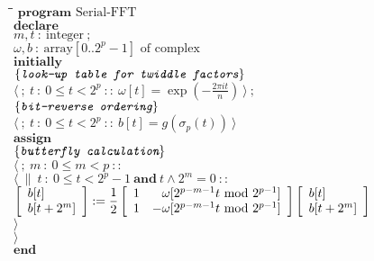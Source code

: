\begin{tabbing}
	\quad\=\quad\=\quad\=\kill
	$\mathbf{program} \textrm{ Serial-FFT}$\\
	$\mathbf{declare}$\\
		\>$m,t\ :\ \textrm{integer}\ ;$\\
		\>$\omega,b\ :\ \mathrm{array}[0..2^{p}-1] \textrm{ of complex}$\\
	$\mathbf{initially}$\\
		\>$\color{MidnightBlue}\curlb{\textit{\ttfamily look-up table for twiddle factors}}$\\
		\>$\langle \ ;\ t\ :\ 0\leq t<2^p\ ::\ \omega[t] = \exp(-\frac{2\pi it}{n})\ \rangle\ ;$\\
		\>$\color{MidnightBlue}\curlb{\textit{\ttfamily bit-reverse ordering}}$\\
		\>$\langle \ ;\ t\ :\ 0\leq t<2^p\ ::\ b[t] = g(\sigma_p(t))\ \rangle$\\
	$\mathbf{assign}$\\
		\>$\color{MidnightBlue}\curlb{\textit{\ttfamily butterfly calculation}}$\\
		\>$\langle \ ;\ m\ :\ 0\leq m<p\ ::$\\
			\>\>$\langle \ \|\ t\ :\ 0\leq t<2^{p}-1\ \mathbf{and}\ t\wedge 2^m=0\ ::$\\
				\>\>\>$\boxb{ \begin{array}{l} b[t] \\ b[t+2^m] \end{array} } := \dfrac{1}{2} \boxb{ \begin{array}{lr} 1 & \omega[2^{p-m-1}t\ \mathrm{mod}\ 2^{p-1}] \\ 1 & -\omega[2^{p-m-1}t\ \mathrm{mod}\ 2^{p-1}] \end{array} }\boxb{ \begin{array}{l} b[t] \\ b[t+2^m] \end{array} }$\\
			\>\>$\rangle$\\
		\>$\rangle$\\
	$\mathbf{end}$\\

\end{tabbing}
